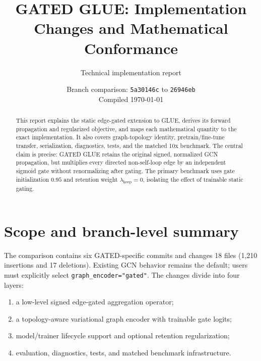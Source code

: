 \documentclass[11pt]{article}
\title{GATED GLUE: Implementation Changes and Mathematical Conformance}
\author{Technical implementation report}
\date{Branch comparison: \code{master} \texttt{5a30146c} to
      \code{GATED\_GLUE} \texttt{26946eb}\\Compiled \today}
\newcommand{\code}[1]{\texttt{#1}}
\begin{document}
\maketitle

\begin{abstract}
This report explains the static edge-gated extension to GLUE, derives its
forward propagation and regularized objective, and maps each mathematical
quantity to the exact implementation.  It also covers graph-topology identity,
pretrain/fine-tune transfer, serialization, diagnostics, tests, and the matched
10x benchmark.  The central claim is precise: GATED GLUE retains the original
signed, normalized GCN propagation, but multiplies every directed non-self-loop
edge by an independent sigmoid gate without renormalizing after gating.
The primary benchmark uses gate initialization $0.95$ and retention weight
$\lambda_{\mathrm{keep}}=0$, isolating the effect of trainable static gating.
\end{abstract}

\tableofcontents
\newpage

\section{Scope and branch-level summary}

The comparison contains six GATED-specific commits and changes 18 files
(1,210 insertions and 17 deletions).  Existing GCN behavior remains the default;
users must explicitly select \code{graph\_encoder="gated"}.  The changes divide
into four layers:
\begin{enumerate}
  \item a low-level signed edge-gated aggregation operator;
  \item a topology-aware variational graph encoder with trainable gate logits;
  \item model/trainer lifecycle support and optional retention regularization;
  \item evaluation, diagnostics, tests, and matched benchmark infrastructure.
\end{enumerate}
\end{document}
